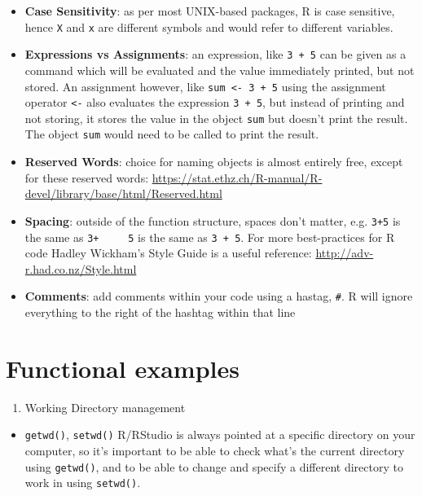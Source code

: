 \documentclass[]{book}
\providecommand{\tightlist}{%
  \setlength{\itemsep}{0pt}\setlength{\parskip}{0pt}}
\begin{document}
\begin{itemize}
\tightlist
\item
  \textbf{Case Sensitivity}: as per most UNIX-based packages, R is case sensitive, hence \texttt{X} and \texttt{x} are different symbols and would refer to different variables.\\
\item
  \textbf{Expressions vs Assignments}: an expression, like \texttt{3\ +\ 5} can be given as a command which will be evaluated and the value immediately printed, but not stored. An assignment however, like \texttt{sum\ \textless{}-\ 3\ +\ 5} using the assignment operator \texttt{\textless{}-} also evaluates the expression \texttt{3\ +\ 5}, but instead of printing and not storing, it stores the value in the object \texttt{sum} but doesn't print the result. The object \texttt{sum} would need to be called to print the result.\\
\item
  \textbf{Reserved Words}: choice for naming objects is almost entirely free, except for these reserved words: \url{https://stat.ethz.ch/R-manual/R-devel/library/base/html/Reserved.html}\\
\item
  \textbf{Spacing}: outside of the function structure, spaces don't matter, e.g. \texttt{3+5} is the same as \texttt{3+\ \ \ \ \ 5} is the same as \texttt{3\ +\ 5}. For more best-practices for R code Hadley Wickham's Style Guide is a useful reference: \url{http://adv-r.had.co.nz/Style.html}
\item
  \textbf{Comments}: add comments within your code using a hastag, \texttt{\#}. R will ignore everything to the right of the hashtag within that line
\end{itemize}

\hypertarget{functional-examples}{%
\section{Functional examples}\label{functional-examples}}

\begin{enumerate}
\def\labelenumi{\arabic{enumi}.}
\tightlist
\item
  Working Directory management
\end{enumerate}

\begin{itemize}
\tightlist
\item
  \texttt{getwd()}, \texttt{setwd()}
  R/RStudio is always pointed at a specific directory on your computer, so it's important to be able to check what's the current directory using \texttt{getwd()}, and to be able to change and specify a different directory to work in using \texttt{setwd()}.
\end{itemize}
\end{document}
